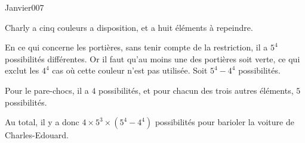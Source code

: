 \begin{corrige}{Janvier007}



Charly a cinq couleurs a disposition, et a huit éléments à repeindre.

En ce qui concerne les portières, sans tenir compte de la restriction, il a $5^4$ possibilités différentes. Or il faut qu'au moins une des portières soit verte, ce qui exclut les $4^4$ cas où cette couleur n'est pas utilisée. Soit $5^4 - 4^4$ possibilités.

Pour le pare-chocs, il a $4$ possibilités, et pour chacun des trois autres éléments, $5$ possibilités.

Au total, il y a donc $4 \times 5^3 \times (5^4 -4^4)$ possibilités pour barioler la voiture de Charles-Edouard.

\end{corrige}
